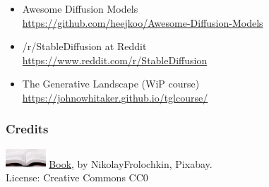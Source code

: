 \documentclass[17pt,aspectratio=169,hyperref={pdfusetitle,colorlinks,allcolors=olive}]{beamer}
\begin{document}
\begin{frame}[fragile]


  {\small
    \begin{itemize}
    \item Awesome Diffusion Models \\
      {\scriptsize \url{https://github.com/heejkoo/Awesome-Diffusion-Models}}
    \item /r/StableDiffusion at Reddit \\
      {\scriptsize \url{https://www.reddit.com/r/StableDiffusion}}
    \item The Generative Landscape (WiP course) \\
      {\scriptsize \url{https://johnowhitaker.github.io/tglcourse/}}
    \end{itemize}
  }  
\end{frame}

\begin{frame}[fragile]
  \frametitle{Credits}

  \includegraphics[width=1.5cm]{figs/bookpages}
  {\small \href{https://pixabay.com/en/book-reading-library-literature-1261800/}{Book}, by NikolayFrolochkin, Pixabay. \\ License: Creative Commons CC0\\}

\end{frame}




\end{document}
